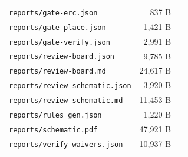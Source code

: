 \documentclass[11pt,a4paper]{article}
\begin{document}
{\begin{longtable}{p{9cm}rp{4cm}}
\texttt{reports/gate-erc.json} & 837 B &  \\
\texttt{reports/gate-place.json} & 1,421 B &  \\
\texttt{reports/gate-verify.json} & 2,991 B &  \\
\texttt{reports/review-board.json} & 9,785 B &  \\
\texttt{reports/review-board.md} & 24,617 B &  \\
\texttt{reports/review-schematic.json} & 3,920 B &  \\
\texttt{reports/review-schematic.md} & 11,453 B &  \\
\texttt{reports/rules\_gen.json} & 1,220 B &  \\
\texttt{reports/schematic.pdf} & 47,921 B &  \\
\texttt{reports/verify-waivers.json} & 10,937 B &  \\
\bottomrule
\end{longtable}
}
\end{document}

